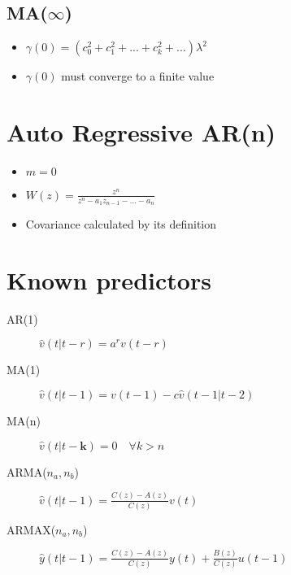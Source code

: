 \documentclass{article}
\begin{document}
\subsection{MA($\infty$)}
\begin{itemize}
\item $\gamma(0)=(c_0^2+c_1^2+...+c_k^2+...)\lambda^2$
\item $\gamma(0)$ must converge to a finite value
\end{itemize}
\section{Auto Regressive AR(n)}
\begin{itemize}
\item $m=0$
\item $W(z)=\frac{z^n}{z^n-a_1z_{n-1}-...-a_n}$
\item Covariance calculated by its definition
\end{itemize}

\section{Known predictors}
\begin{description}
\item[AR(1)] $\hat{v}(t|t-r)=a^rv(t-r)$
\item[MA(1)] $\hat{v}(t|t-1)=v(t-1)-c\hat{v}(t-1|t-2)$
\item[MA(n)] $\hat{v}(t|t-\textbf{k})=0 \quad \forall k>n$
\item[ARMA($n_a,n_b$)] $\hat{v}(t|t-1)=
\frac{C(z)-A(z)}{C(z)}v(t)$
\item[ARMAX($n_a,n_b$)] $\hat{y}(t|t-1)=
\frac{C(z)-A(z)}{C(z)}y(t)
+\frac{B(z)}{C(z)}u(t-1)$
\end{description}
\end{document}
